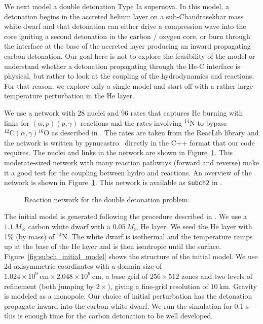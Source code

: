 \documentclass[times,preprint]{aastex63}
\newcommand{\pynucastro}{{\sf pynucastro}}
\newcommand{\isot}[2]{$^{#2}\mathrm{#1}$}
\newcommand{\isotm}[2]{{}^{#2}\mathrm{#1}}
\newcommand{\MarginPar}[1]{\marginpar{\vskip-\baselineskip\raggedright\tiny\sffamily\hrule\smallskip{\color{red}#1}\par\smallskip\hrule}}
\begin{document}
We next model a double detonation Type Ia
supernova.  In this model, a detonation begins in the accreted helium
layer on a sub-Chandrasekhar mass white dwarf and that detonation can
either drive a compression wave into the core igniting a second
detonation in the carbon / oxygen core, or burn through the interface
at the base of the accreted layer producing an inward propagating
carbon detonation.  Our goal here is not to explore the feasibility of
the model or understand whether a detonation propagating through the
He-C interface is physical, but rather to look at the coupling of the
hydrodynamics and reactions.  For that reason, we explore only a
single model and start off with a rather large temperature
perturbation in the He layer.

We use a network with 28 nuclei and 96 rates that captures He burning \MarginPar{should I do a few aprox13 runs for comparison?}
with links for $(\alpha,p)(p,\gamma)$ reactions and the rates
involving \isot{N}{14} to bypass
$\isotm{C}{12}(\alpha,\gamma)\isotm{O}{16}$ as described in
\cite{shenbildsten}.  The rates are taken from the ReacLib library
\citep{reaclib} and the network is written by
\pynucastro~\citep{pynucastro} directly in the C++ format that our
code requires.  The nuclei and links in the network are shown in
Figure~\ref{fig:subch_network}.  This moderate-sized network with many
reaction pathways (forward and reverse) make it a good test for the
coupling between hydro and reactions.  An overview of the network is
shown in Figure~\ref{fig:subch_network}.  This network is available 
as {\tt subch2} in \citep{microphysics}.


\begin{figure}[t]
\centering
{}
\caption{\label{fig:subch_network} Reaction network for the double detonation problem.}
\end{figure}


The initial model is generated following the procedure described in
\citep{subchandra}.  We use a $1.1~M_\odot$ carbon white dwarf with a
$0.05~M_\odot$ He layer.  We seed the He layer with 1\% (by mass) of
\isot{N}{14}.  The white dwarf is isothermal and the temperature ramps
up at the base of the He layer and is then isentropic until the
surface.  Figure~\ref{fig:subch_initial_model} shows the structure of
the initial model.  We use 2d axisymmetric coordinates with a domain
size of $1.024\times 10^9~\mathrm{cm} \times 2.048\times
10^9~\mathrm{cm}$, a base grid of $256 \times 512$ zones and two
levels of refinement (both jumping by $2\times$), giving a fine-grid
resolution of $10~\mathrm{km}$.  Gravity is modeled as a monopole.
Our choice of initial perturbation has the detonation propagate inward
into the carbon white dwarf.  We run the simulation for 0.1 s---this
is enough time for the carbon detonation to be well developed.
\end{document}
